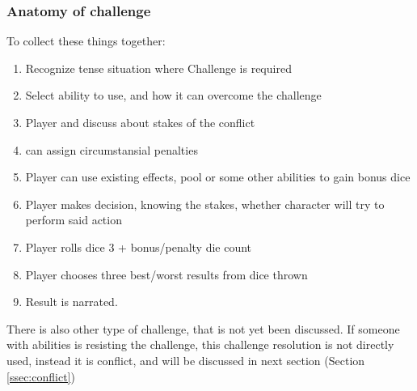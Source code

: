 \subsubsection{Anatomy of challenge}
To collect these things together:
\begin{enumerate}
\item Recognize tense situation where Challenge is required
\item Select ability to use, and how it can overcome the challenge
\item Player and \gM discuss about stakes of the conflict
\item \GM{} can assign circumstansial penalties
\item Player can use existing effects, pool or some other abilities to gain bonus dice
\item Player makes decision, knowing the stakes, whether character will try to perform said action
\item Player rolls dice 3 + bonus/penalty die count
\item Player chooses three best/worst results from dice thrown
\item Result is narrated.
\end{enumerate}

There is also other type of challenge, that is not yet been discussed.
If someone with abilities is resisting the challenge, this challenge resolution is not directly used, instead it is conflict, and will be discussed in next section (Section \ref{ssec:conflict})

\pagebreak
